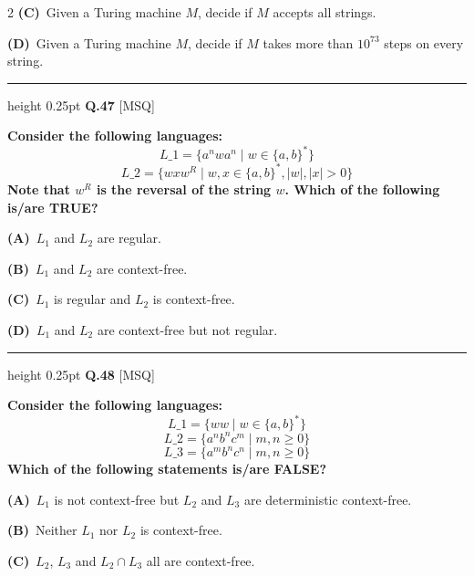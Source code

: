 \documentclass[a4paper,10pt,twoside]{article}
\begin{document}
\begin{multicols}{2}
\textbf{(C)}~Given a Turing machine $M$, decide if $M$ accepts all strings.\par\vspace{2pt}\noindent
\textbf{(D)}~Given a Turing machine $M$, decide if $M$ takes more than $10^{73}$ steps on every string.
\par\vspace{6pt}\hrule height 0.25pt\vspace{6pt}
\noindent\textbf{Q.47} \hfill {\footnotesize\textsf{[MSQ]}}
\par\vspace{2pt}
{\bfseries Consider the following languages:
\[ L\_1 = \{a^n w a^n \mid w \in \{a, b\}^*\} \]
\[ L\_2 = \{w x w^R \mid w, x \in \{a, b\}^*, |w|, |x| > 0\} \]
Note that $w^R$ is the reversal of the string $w$. Which of the following is/are TRUE? \par}
\par\vspace{2pt}\noindent
\textbf{(A)}~$L_1$ and $L_2$ are regular.\par\vspace{2pt}\noindent
\textbf{(B)}~$L_1$ and $L_2$ are context-free.\par\vspace{2pt}\noindent
\textbf{(C)}~$L_1$ is regular and $L_2$ is context-free.\par\vspace{2pt}\noindent
\textbf{(D)}~$L_1$ and $L_2$ are context-free but not regular.
\par\vspace{6pt}\hrule height 0.25pt\vspace{6pt}
\noindent\textbf{Q.48} \hfill {\footnotesize\textsf{[MSQ]}}
\par\vspace{2pt}
{\bfseries Consider the following languages:
\[ L\_1 = \{w w \mid w \in \{a, b\}^*\} \]
\[ L\_2 = \{a^n b^n c^m \mid m, n \ge 0\} \]
\[ L\_3 = \{a^m b^n c^n \mid m, n \ge 0\} \]
Which of the following statements is/are FALSE? \par}
\par\vspace{2pt}\noindent
\textbf{(A)}~$L_1$ is not context-free but $L_2$ and $L_3$ are deterministic context-free.\par\vspace{2pt}\noindent
\textbf{(B)}~Neither $L_1$ nor $L_2$ is context-free.\par\vspace{2pt}\noindent
\textbf{(C)}~$L_2$, $L_3$ and $L_2 \cap L_3$ all are context-free.\par\vspace{2pt}\noindent

\end{multicols}
\end{document}
